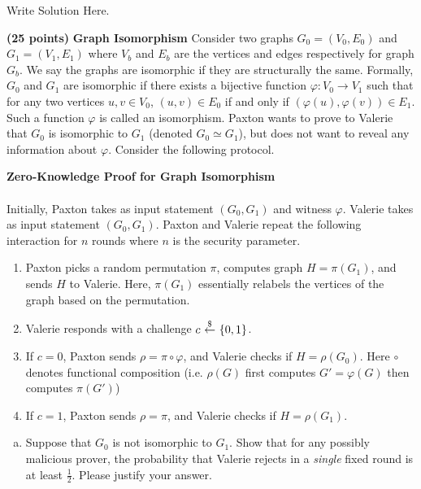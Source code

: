 \documentclass[12pt]{hw}
\begin{document}
\begin{answer}
  Write Solution Here.
\end{answer}


\begin{exercise}
{\bf (25 points)}
{\bf Graph Isomorphism}
Consider two graphs $G_0 = (V_0,E_0) $ and $G_1= (V_1,E_1)$ where $V_b$ and $E_b$ are the vertices and edges respectively for graph $G_b$. We say the graphs are isomorphic if they are structurally the same. Formally, $G_0$ and $G_1$ are isomorphic if there exists a bijective function $\varphi: V_0 \to V_1$ such that for any two vertices $u,v \in V_0$, $(u,v) \in E_0$ if and only if $(\varphi(u),\varphi(v)) \in E_1$. Such a function $\varphi$ is called an isomorphism.
Paxton wants to prove to Valerie that $G_0$ is isomorphic to $G_1$ (denoted $G_0 \simeq G_1$),
but does not want to reveal any information about $\varphi$.
Consider the following protocol.
\vspace{1em}
\begin{mdframed}
    \vspace{0.5em}
    \textbf{Zero-Knowledge Proof for Graph Isomorphism}\\\\
    Initially, Paxton takes as input statement $(G_0, G_1)$ and witness $\varphi$. Valerie takes as input statement $(G_0, G_1)$.
    Paxton and Valerie repeat the following interaction for $n$ rounds where $n$ is the security parameter.
    \begin{enumerate}
        \item Paxton picks a random permutation $\pi$, computes graph $H = \pi(G_1)$, and sends $H$ to Valerie. Here, $\pi(G_1)$ essentially relabels the vertices of the graph based on the permutation.
        \item Valerie responds with a challenge $c\ \sample\ \{0, 1\}$.
        \item If $c = 0$, Paxton sends $\rho = \pi \circ \varphi$, and Valerie checks if $H = \rho(G_0)$. Here $\circ$ denotes functional composition (i.e. $\rho(G)$ first computes $G' = \varphi(G)$ then computes $\pi(G')$)
        \item If $c = 1$, Paxton sends $\rho = \pi$, and Valerie checks if $H = \rho(G_1)$.
    \end{enumerate}
\end{mdframed}
\vspace{1em}


\begin{enumerate}[(a)]
\item Suppose that $G_0$ is not isomorphic to $G_1$. 
Show that for any possibly malicious prover, the probability 
that 
Valerie rejects in a \emph{single} fixed round is at least $\frac12$. 
Please justify your answer.


\end{enumerate}
\end{exercise}
\end{document}
